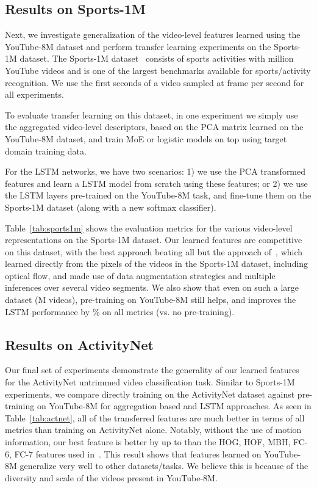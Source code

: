 \documentclass{sig-alternate-05-2015}
\begin{document}
\subsection{Results on Sports-1M}

Next, we investigate generalization of the video-level features learned using the YouTube-8M dataset and perform transfer learning experiments on the Sports-1M dataset. The Sports-1M dataset~\cite{karpathy2014large} consists of  sports activities with  million YouTube videos and is one of the largest benchmarks available for sports/activity recognition. We use the first  seconds of a video sampled at  frame per second for all experiments.

To evaluate transfer learning on this dataset, in one experiment we simply use
the aggregated video-level descriptors, based on the PCA matrix learned on the
YouTube-8M dataset, and train MoE or logistic models on top using target domain training data.


For the LSTM networks, we have two scenarios: 1) we use the PCA transformed features and learn a LSTM model from scratch using these features; or 2) we use the LSTM layers pre-trained on the YouTube-8M task, and fine-tune them on the Sports-1M dataset (along with a new softmax classifier).

Table~\ref{tab:sports1m} shows the evaluation metrics for the various
video-level representations on the Sports-1M dataset.  Our learned features are
competitive on this dataset, with the best approach beating all but the approach
of~\cite{beyond}, which learned directly from the pixels of the videos in the
Sports-1M dataset, including optical flow, and made use of data augmentation
strategies and multiple inferences over several video segments. We also show that
even on such a large dataset (M videos), pre-training on YouTube-8M still helps,
and improves the LSTM performance by \% on all metrics (vs. no pre-training).


\subsection{Results on ActivityNet}

Our final set of experiments demonstrate the generality of our learned features
for the ActivityNet untrimmed video classification task. Similar to Sports-1M
experiments, we compare directly training on the ActivityNet dataset against
pre-training on YouTube-8M for aggregation based and LSTM approaches. As seen in
Table~\ref{tab:actnet}, all of the transferred features are much better in terms
of all metrics than training on ActivityNet alone. Notably, without the use of
motion information, our best feature is better by up to  than the HOG, HOF,
MBH, FC-6, FC-7 features used in~\cite{actnet}. This result shows that features
learned on YouTube-8M generalize very well to other datasets/tasks. We believe
this is because of the diversity and scale of the videos present in YouTube-8M.
\end{document}
